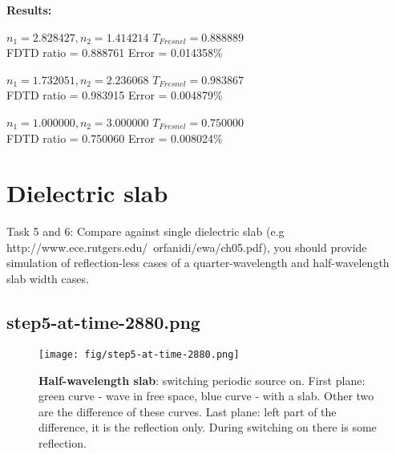 \documentclass[fullscreen=true]{beamer}
\begin{document}
\begin{frame}
  \textbf{Results:}
  \begin{block}{
    $n_1 = 2.828427, n_2 = 1.414214$}
    $T_{Fresnel} = 0.888889$\\
    FDTD ratio = 0.888761 Error = 0.014358\%\\
  \end{block}

  \begin{block}{   $n_1 = 1.732051, n_2 = 2.236068$}
    $T_{Fresnel} = 0.983867$\\
    FDTD ratio = 0.983915 Error =
    0.004879\%\\
  \end{block}
  \begin{block}{$n_1 = 1.000000, n_2 = 3.000000$}
    $T_{Fresnel} = 0.750000$\\
    FDTD ratio = 0.750060 Error = 0.008024\%
  \end{block}
\end{frame}

\section{Dielectric slab}

\begin{frame}
  \begin{block}{Task 5 and 6:}
    Compare against single dielectric slab (e.g
    http://www.ece.rutgers.edu/~orfanidi/ewa/ch05.pdf), you should
    provide simulation of reflection-less cases of a quarter-wavelength
    and half-wavelength slab width cases.
  \end{block}
\end{frame}

\subsection{step5-at-time-2880.png}
\begin{frame}
  \begin{figure}
    \texttt{[image: fig/step5-at-time-2880.png]}%
    \caption{\textbf{Half-wavelength slab}: switching periodic source
      on. First plane: green curve - wave in free space, blue curve -
      with a slab. Other two are the difference of these curves. Last plane:
      left part of the difference, it is the reflection only. During
      switching on there is some reflection.}
  \end{figure}
\end{frame}
\end{document}
